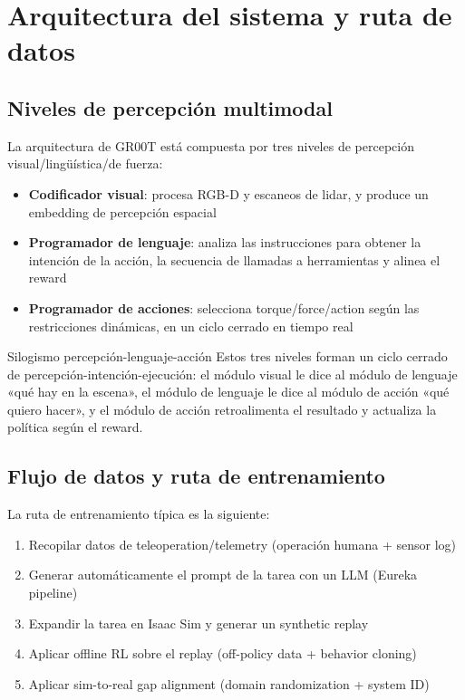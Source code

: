 \section{Arquitectura del sistema y ruta de datos}

\subsection{Niveles de percepción multimodal}

La arquitectura de GR00T está compuesta por tres niveles de percepción visual/lingüística/de fuerza:

\begin{itemize}
    \item \textbf{Codificador visual}: procesa RGB-D y escaneos de lidar, y produce un embedding de percepción espacial
    \item \textbf{Programador de lenguaje}: analiza las instrucciones para obtener la intención de la acción, la secuencia de llamadas a herramientas y alinea el reward
    \item \textbf{Programador de acciones}: selecciona torque/force/action según las restricciones dinámicas, en un ciclo cerrado en tiempo real
\end{itemize}

\begin{knowledgebox}{Silogismo percepción-lenguaje-acción}
Estos tres niveles forman un ciclo cerrado de percepción-intención-ejecución: el módulo visual le dice al módulo de lenguaje «qué hay en la escena», el módulo de lenguaje le dice al módulo de acción «qué quiero hacer», y el módulo de acción retroalimenta el resultado y actualiza la política según el reward.
\end{knowledgebox}

\subsection{Flujo de datos y ruta de entrenamiento}

La ruta de entrenamiento típica es la siguiente:

\begin{enumerate}
    \item Recopilar datos de teleoperation/telemetry (operación humana + sensor log)
    \item Generar automáticamente el prompt de la tarea con un LLM (Eureka pipeline)
    \item Expandir la tarea en Isaac Sim y generar un synthetic replay
    \item Aplicar offline RL sobre el replay (off-policy data + behavior cloning)
    \item Aplicar sim-to-real gap alignment (domain randomization + system ID)
\end{enumerate}

